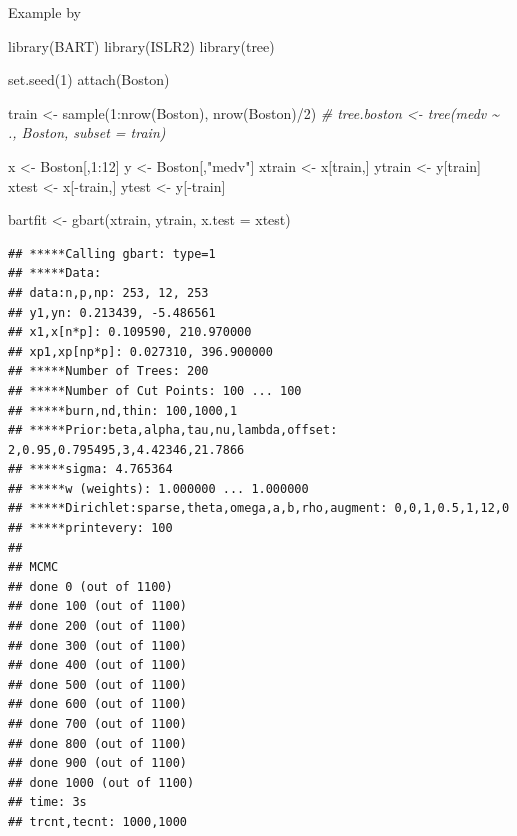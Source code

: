 \documentclass[
]{book}
\newenvironment{Shaded}{\begin{snugshade}}{\end{snugshade}}
\newcommand{\AttributeTok}[1]{\textcolor[rgb]{0.77,0.63,0.00}{#1}}
\newcommand{\CommentTok}[1]{\textcolor[rgb]{0.56,0.35,0.01}{\textit{#1}}}
\newcommand{\DecValTok}[1]{\textcolor[rgb]{0.00,0.00,0.81}{#1}}
\newcommand{\FunctionTok}[1]{\textcolor[rgb]{0.00,0.00,0.00}{#1}}
\newcommand{\NormalTok}[1]{#1}
\newcommand{\OtherTok}[1]{\textcolor[rgb]{0.56,0.35,0.01}{#1}}
\newcommand{\SpecialCharTok}[1]{\textcolor[rgb]{0.00,0.00,0.00}{#1}}
\newcommand{\StringTok}[1]{\textcolor[rgb]{0.31,0.60,0.02}{#1}}
\begin{document}
Example by \citep[Ch 8.3]{james2013}

\begin{Shaded}
\begin{Highlighting}[]
\FunctionTok{library}\NormalTok{(BART)}
\FunctionTok{library}\NormalTok{(ISLR2)}
\FunctionTok{library}\NormalTok{(tree)}

\FunctionTok{set.seed}\NormalTok{(}\DecValTok{1}\NormalTok{)}
\FunctionTok{attach}\NormalTok{(Boston)}

\NormalTok{train }\OtherTok{\textless{}{-}} \FunctionTok{sample}\NormalTok{(}\DecValTok{1}\SpecialCharTok{:}\FunctionTok{nrow}\NormalTok{(Boston), }\FunctionTok{nrow}\NormalTok{(Boston)}\SpecialCharTok{/}\DecValTok{2}\NormalTok{)}
\CommentTok{\# tree.boston \textless{}{-} tree(medv \textasciitilde{} ., Boston, subset = train)}

\NormalTok{x }\OtherTok{\textless{}{-}}\NormalTok{ Boston[,}\DecValTok{1}\SpecialCharTok{:}\DecValTok{12}\NormalTok{]}
\NormalTok{y }\OtherTok{\textless{}{-}}\NormalTok{ Boston[,}\StringTok{"medv"}\NormalTok{]}
\NormalTok{xtrain }\OtherTok{\textless{}{-}}\NormalTok{ x[train,]}
\NormalTok{ytrain }\OtherTok{\textless{}{-}}\NormalTok{ y[train]}
\NormalTok{xtest }\OtherTok{\textless{}{-}}\NormalTok{ x[}\SpecialCharTok{{-}}\NormalTok{train,]}
\NormalTok{ytest }\OtherTok{\textless{}{-}}\NormalTok{ y[}\SpecialCharTok{{-}}\NormalTok{train]}

\NormalTok{bartfit }\OtherTok{\textless{}{-}} \FunctionTok{gbart}\NormalTok{(xtrain, ytrain, }\AttributeTok{x.test =}\NormalTok{ xtest)}
\end{Highlighting}
\end{Shaded}

\begin{verbatim}
## *****Calling gbart: type=1
## *****Data:
## data:n,p,np: 253, 12, 253
## y1,yn: 0.213439, -5.486561
## x1,x[n*p]: 0.109590, 210.970000
## xp1,xp[np*p]: 0.027310, 396.900000
## *****Number of Trees: 200
## *****Number of Cut Points: 100 ... 100
## *****burn,nd,thin: 100,1000,1
## *****Prior:beta,alpha,tau,nu,lambda,offset: 2,0.95,0.795495,3,4.42346,21.7866
## *****sigma: 4.765364
## *****w (weights): 1.000000 ... 1.000000
## *****Dirichlet:sparse,theta,omega,a,b,rho,augment: 0,0,1,0.5,1,12,0
## *****printevery: 100
## 
## MCMC
## done 0 (out of 1100)
## done 100 (out of 1100)
## done 200 (out of 1100)
## done 300 (out of 1100)
## done 400 (out of 1100)
## done 500 (out of 1100)
## done 600 (out of 1100)
## done 700 (out of 1100)
## done 800 (out of 1100)
## done 900 (out of 1100)
## done 1000 (out of 1100)
## time: 3s
## trcnt,tecnt: 1000,1000
\end{verbatim}
\end{document}
